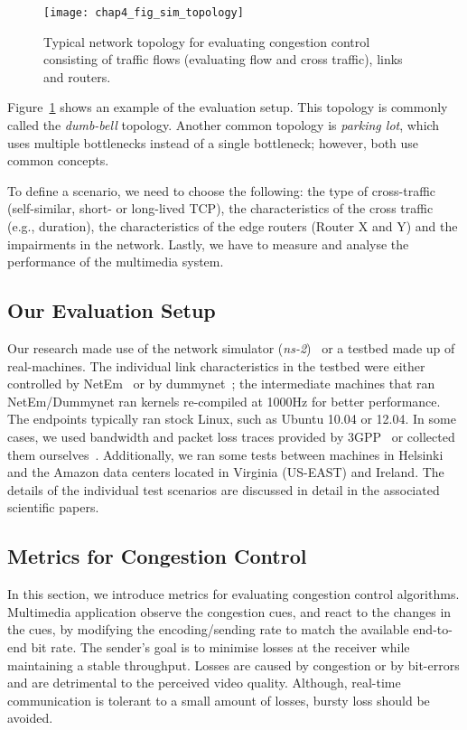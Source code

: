\begin{figure}[!t]
\texttt{[image: chap4\_fig\_sim\_topology]}
\caption{Typical network topology for evaluating congestion control consisting
of traffic flows (evaluating flow and cross traffic), links and routers.}
\label{fig:4:topology}
\end{figure}


Figure~\ref{fig:4:topology} shows an example of the evaluation setup. This
topology is commonly called the \emph{dumb-bell} topology. Another common
topology is \emph{parking lot}, which uses multiple bottlenecks instead of a
single bottleneck; however, both use common concepts.


To define a scenario, we need to choose the following: the type of
cross-traffic (self-similar, short- or long-lived TCP), the characteristics of the
cross traffic (e.g., duration), the characteristics of the edge routers
(Router X and Y) and the impairments in the network. Lastly, we have to
measure and analyse the performance of the multimedia system.


\subsection{Our Evaluation Setup}

Our research made use of the network simulator (\emph{ns-2})~\cite{ns2} or a
testbed made up of real-machines. The individual link characteristics in the
testbed were either controlled by NetEm~\cite{netem} or by
dummynet~\cite{Carbone:2010p3502}; the intermediate machines that ran
NetEm/Dummynet ran kernels re-compiled at 1000Hz for better performance. The
endpoints typically ran stock Linux, such as Ubuntu 10.04 or 12.04. In some
cases, we used bandwidth and packet loss traces provided by
3GPP~\cite{s4.eval.bitrate} or collected them ourselves~\cite{sharmistha-thesis}.
Additionally, we ran some tests between machines in Helsinki and the
Amazon data centers located in Virginia (US-EAST) and Ireland. The details of the
individual test scenarios are discussed in detail in the associated scientific
papers.

\subsection{Metrics for Congestion Control}
\label{subsec.metrics}

In this section, we introduce metrics for evaluating congestion control
algorithms. Multimedia application observe the congestion cues, and react to
the changes in the cues, by modifying the encoding/sending rate to match the
available end-to-end bit rate. The sender's goal is to minimise losses at the
receiver while maintaining a stable throughput. Losses are caused by
congestion or by bit-errors and are detrimental to the perceived video quality. Although,
real-time communication is tolerant to a small amount of losses, bursty loss
should be avoided.

